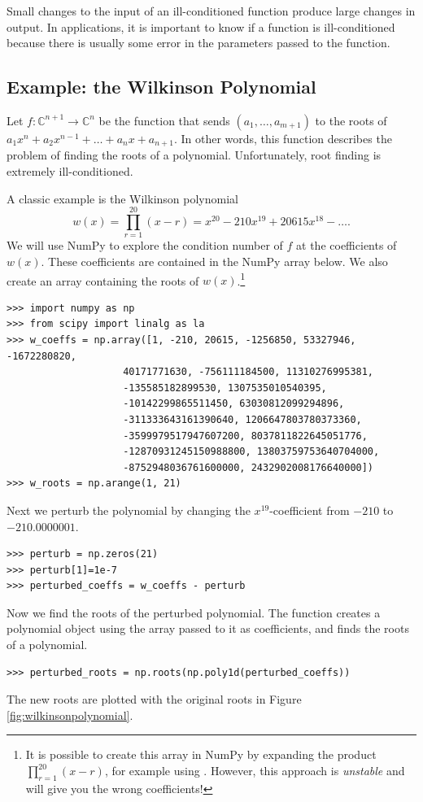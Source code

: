 Small changes to the input of an ill-conditioned function produce large changes in output.
In applications, it is important to know if a function is ill-conditioned because there is usually some error in the parameters passed to the function.

\subsection*{Example: the Wilkinson Polynomial}
Let $f:\mathbb{C}^{n+1} \rightarrow \mathbb{C}^n$ be the function that sends $(a_1, \ldots, a_{m+1})$ to the roots of $a_1x^n+a_2x^{n-1}+\ldots+a_nx+a_{n+1}$.
In other words, this function describes the problem of finding the roots of a polynomial.
Unfortunately, root finding is extremely ill-conditioned.

A classic example is the Wilkinson polynomial 
\[
w(x) = \prod_{r=1}^{20}(x-r) = x^{20}-210x^{19}+20615x^{18}-\ldots.
\]
We will use NumPy to explore the condition number of $f$ at the coefficients of $w(x)$.
These coefficients are contained in the NumPy array  below.
We also create an array  containing the roots of $w(x)$.\footnote{
It is possible to create this array in NumPy by expanding the product $\prod_{r=1}^{20}(x-r)$, for example using .
However, this approach is \emph{unstable} and will give you the wrong coefficients!}
\begin{lstlisting}
>>> import numpy as np
>>> from scipy import linalg as la
>>> w_coeffs = np.array([1, -210, 20615, -1256850, 53327946, -1672280820,
                    40171771630, -756111184500, 11310276995381,
                    -135585182899530, 1307535010540395,
                    -10142299865511450, 63030812099294896,
                    -311333643161390640, 1206647803780373360,
                    -3599979517947607200, 8037811822645051776,
                    -12870931245150988800, 13803759753640704000,
                    -8752948036761600000, 2432902008176640000])
>>> w_roots = np.arange(1, 21)
\end{lstlisting}

Next we perturb the polynomial by changing the $x^{19}$-coefficient from $-210$ to $-210.0000001$.
\begin{lstlisting}
>>> perturb = np.zeros(21)
>>> perturb[1]=1e-7
>>> perturbed_coeffs = w_coeffs - perturb
\end{lstlisting}

Now we find the roots of the perturbed polynomial.
The function  creates a polynomial object using the array passed to it as coefficients, and  finds the roots of a polynomial.
\begin{lstlisting}
>>> perturbed_roots = np.roots(np.poly1d(perturbed_coeffs))
\end{lstlisting}
The new roots are plotted with the original roots in Figure \ref{fig:wilkinsonpolynomial}. 

